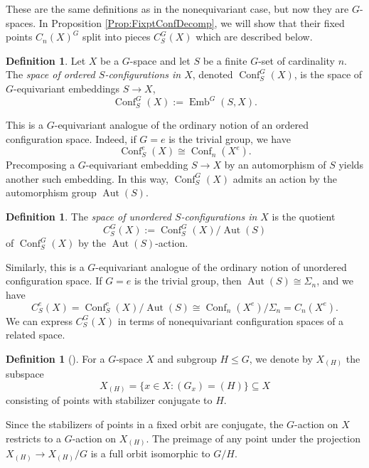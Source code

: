 \documentclass[11pt]{amsart}
\theoremstyle{definition}
\newtheorem{definition}[equation]{Definition}
\numberwithin{equation}{subsection} %
\newcommand{\Conf}{\operatorname{Conf}}
\newcommand{\Aut}{\operatorname{Aut}}
\def\Emb{\operatorname{Emb}}
\begin{document}
These are the same definitions as in the nonequivariant case, but now they are
$G$-spaces. In Proposition \ref{Prop:FixptConfDecomp}, we will show that their
fixed points $C_n(X)^G$ split into pieces $C_S^G(X)$ which are described below.

\begin{definition}\label{Def:ConfG}
Let $X$ be a $G$-space and let $S$ be a finite $G$-set of cardinality $n$. The \emph{space of ordered $S$-configurations in $X$}, denoted $\Conf^G_S(X)$, is the space of $G$-equivariant embeddings $S\to X$,
$$\Conf_S^G(X) := \Emb^G(S,X).$$
\end{definition}

This is a $G$-equivariant analogue of the ordinary notion of an ordered configuration space. Indeed, if $G=e$ is the trivial group, we have
$$ \Conf^e_S(X) \cong \Conf_{n}(X^e). $$
Precomposing a $G$-equivariant embedding $S\to X$ by an automorphism of $S$ yields another such embedding. In this way, $\Conf^G_S(X)$ admits an action by the automorphism group $\Aut(S)$. 

\begin{definition} \label{Def:CGS}
The \emph{space of unordered $S$-configurations in $X$} is the quotient
$$ C^G_S(X) := \Conf^G_S(X)/\Aut(S) $$
of $\Conf^G_S(X)$ by the $\Aut(S)$-action.
\end{definition} 

Similarly, this is a $G$-equivariant analogue of the ordinary notion of unordered configuration space. If $G=e$ is the trivial group, then $\Aut(S)\cong\Sigma_{n}$, and we have
$$ C^e_S(X) = \Conf^e_S(X)/\Aut(S) \cong \Conf_{n}(X^e)/\Sigma_{n} = C_{n}(X^e).$$
We can express $C^G_S(X)$ in terms of
nonequivariant configuration spaces of a related space.

\begin{definition}[{\cite[Section I.5]{tom-dieck-transformation-groups}}] \label{Def:X_(H)}
For a $G$-space $X$ and subgroup $H\leq G$, we denote by $X_{(H)}$ the subspace 
$$ X_{(H)} = \{ x\in X : (G_x) = (H) \} \subseteq X $$
consisting of points with stabilizer conjugate to $H$.
\end{definition}

Since the stabilizers of points in a fixed orbit are conjugate, the $G$-action on $X$ restricts to a $G$-action on $X_{(H)}$. The preimage of any point under the projection $X_{(H)}\to X_{(H)}/G$ is a full orbit isomorphic to $G/H$.
\end{document}
